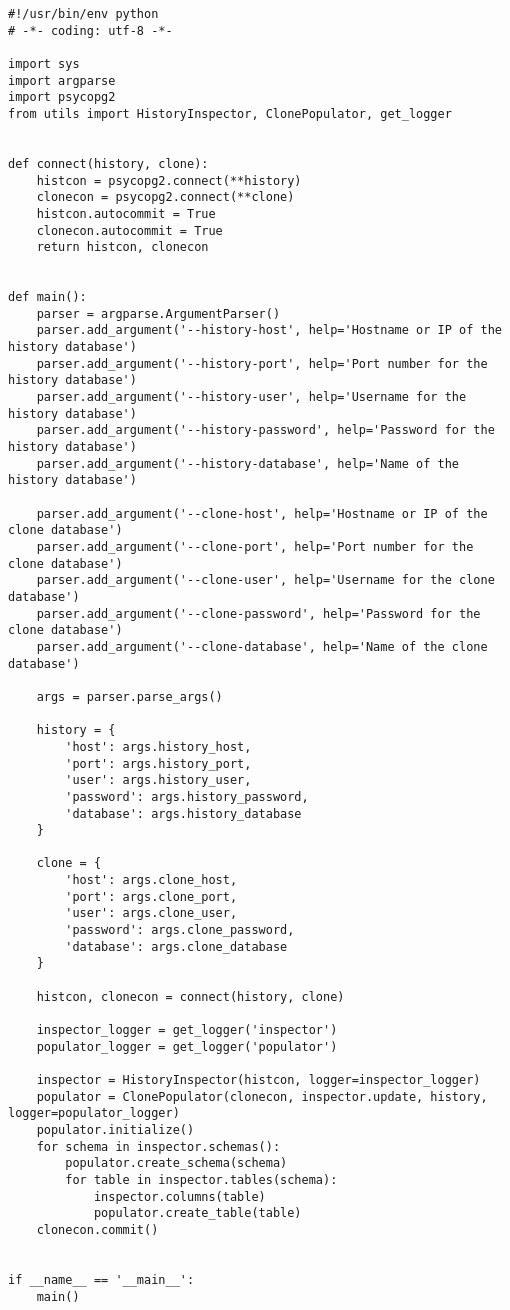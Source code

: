 \begin{lstlisting}[caption={clone.py}]
#!/usr/bin/env python
# -*- coding: utf-8 -*-

import sys
import argparse
import psycopg2
from utils import HistoryInspector, ClonePopulator, get_logger


def connect(history, clone):
    histcon = psycopg2.connect(**history)
    clonecon = psycopg2.connect(**clone)
    histcon.autocommit = True
    clonecon.autocommit = True
    return histcon, clonecon


def main():
    parser = argparse.ArgumentParser()
    parser.add_argument('--history-host', help='Hostname or IP of the history database')
    parser.add_argument('--history-port', help='Port number for the history database')
    parser.add_argument('--history-user', help='Username for the history database')
    parser.add_argument('--history-password', help='Password for the history database')
    parser.add_argument('--history-database', help='Name of the history database')

    parser.add_argument('--clone-host', help='Hostname or IP of the clone database')
    parser.add_argument('--clone-port', help='Port number for the clone database')
    parser.add_argument('--clone-user', help='Username for the clone database')
    parser.add_argument('--clone-password', help='Password for the clone database')
    parser.add_argument('--clone-database', help='Name of the clone database')

    args = parser.parse_args()

    history = {
        'host': args.history_host,
        'port': args.history_port,
        'user': args.history_user,
        'password': args.history_password,
        'database': args.history_database
    }

    clone = {
        'host': args.clone_host,
        'port': args.clone_port,
        'user': args.clone_user,
        'password': args.clone_password,
        'database': args.clone_database
    }

    histcon, clonecon = connect(history, clone)

    inspector_logger = get_logger('inspector')
    populator_logger = get_logger('populator')

    inspector = HistoryInspector(histcon, logger=inspector_logger)
    populator = ClonePopulator(clonecon, inspector.update, history, logger=populator_logger)
    populator.initialize()
    for schema in inspector.schemas():
        populator.create_schema(schema)
        for table in inspector.tables(schema):
            inspector.columns(table)
            populator.create_table(table)
    clonecon.commit()


if __name__ == '__main__':
    main()
\end{lstlisting}